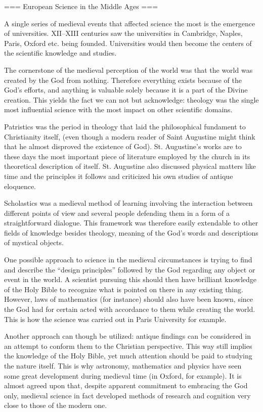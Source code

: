 === European Science in the Middle Ages ===

A single series of medieval events that affected science the most is the emergence of universities. XII–XIII centuries saw the universities in Cambridge, Naples, Paris, Oxford etc. being founded. Universities would then become the centers of the scientific knowledge and studies.

The cornerstone of the medieval perception of the world was that the world was created by the God from nothing. Therefore everything exists because of the God's efforts, and anything is valuable solely because it is a part of the Divine creation. This yields the fact we can not but acknowledge: theology was the single most influential science with the most impact on other scientific domains.

Patristics was the period in theology that laid the philosophical fundament to Christianity itself, (even though a modern reader of Saint Augustine might think that he almost disproved the existence of God). St. Augustine's works are to these days the most important piece of literature employed by the church in its theoretical description of itself. St. Augustine also discussed physical matters like time and the principles it follows and criticized his own studies of antique eloquence.

Scholastics was a medieval method of learning involving the interaction between different points of view and several people defending them in a form of a straightforward dialogue. This framework was therefore easily extendable to other fields of knowledge besides theology, meaning of the God's words and descriptions of mystical objects.

One possible approach to science in the medieval circumstances is trying to find and describe the “design principles” followed by the God regarding any object or event in the world. A scientist pursuing this should then have brilliant knowledge of the Holy Bible to recognize what is pointed on there in any existing thing. However, laws of mathematics (for instance) should also have been known, since the God had for certain acted with accordance to them while creating the world. This is how the science was carried out in Paris University for example.

Another approach can though be utilized: antique findings can be considered in an attempt to conform them to the Christian perspective. This way still implies the knowledge of the Holy Bible, yet much attention should be paid to studying the nature itself. This is why astronomy, mathematics and physics have seen some great development during medieval time (in Oxford, for example). It is almost agreed upon that, despite apparent commitment to embracing the God only, medieval science in fact developed methods of research and cognition very close to those of the modern one.

